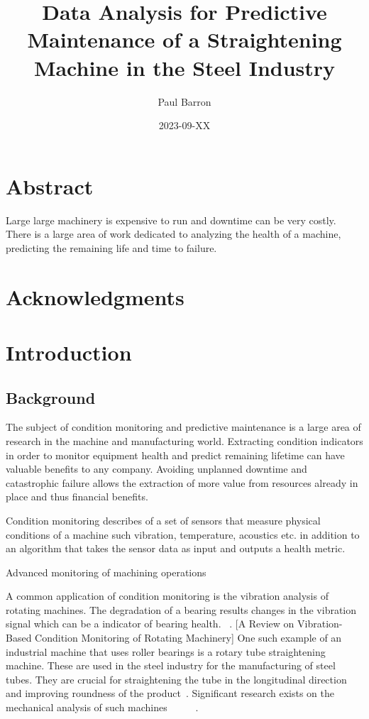 \documentclass{article}
\title{Data Analysis for Predictive Maintenance of a Straightening Machine in the Steel Industry}
\date{2023-09-XX}
\author{Paul Barron}
\begin{document}
\maketitle
\newpage
{}
\tableofcontents
\newpage
\section{Abstract}
Large large machinery is expensive to run and downtime can be very costly. There is a large area of work dedicated to analyzing the health of a machine, predicting the remaining life and time to failure.
\clearpage
\section{Acknowledgments}
\clearpage
\section{Introduction}
\subsection{Background}
The subject of condition monitoring and predictive maintenance is a large area of research in the machine and manufacturing world. Extracting condition indicators in order to monitor equipment health and predict remaining lifetime can have valuable benefits to any company. Avoiding unplanned downtime and catastrophic failure allows the extraction of more value from resources already in place and thus financial benefits.

Condition monitoring describes of a set of sensors that measure physical conditions of a machine such vibration, temperature, acoustics etc. in addition to an algorithm that takes the sensor data as input and outputs a health metric.

Advanced monitoring of machining operations~\cite{teti2010advanced}

A common application of condition monitoring is the vibration analysis of rotating machines. The degradation of a bearing results changes in the vibration signal which can be a indicator of bearing health. ~\cite{soualhi2021novel}.
[A Review on Vibration-Based Condition Monitoring of Rotating Machinery]
One such example of an industrial machine that uses roller bearings is a rotary tube straightening machine. These are used in the steel industry for the manufacturing of steel tubes. They are crucial for straightening the tube in the longitudinal direction and improving roundness of the product~\cite{yoshimura2009effect}. Significant research exists on the mechanical analysis of such machines ~\cite{kato2014straightening}~\cite{ma2020effect}~\cite{ma2021analysis}~\cite{yu2018theoretical}~\cite{das1991mechanics}. 
\end{document}
